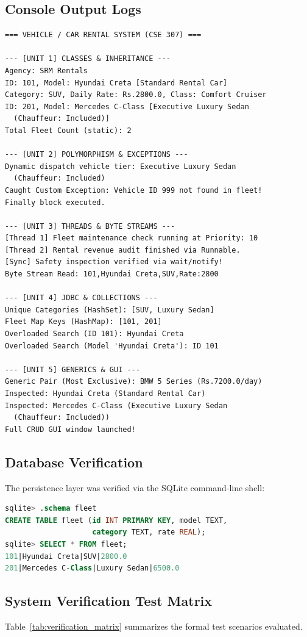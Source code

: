 \documentclass[11pt,a4paper]{article}
\begin{document}
\subsection{Console Output Logs}
\begin{lstlisting}[language={}, caption={Application Console Output}]
=== VEHICLE / CAR RENTAL SYSTEM (CSE 307) ===

--- [UNIT 1] CLASSES & INHERITANCE ---
Agency: SRM Rentals
ID: 101, Model: Hyundai Creta [Standard Rental Car]
Category: SUV, Daily Rate: Rs.2800.0, Class: Comfort Cruiser
ID: 201, Model: Mercedes C-Class [Executive Luxury Sedan
  (Chauffeur: Included)]
Total Fleet Count (static): 2

--- [UNIT 2] POLYMORPHISM & EXCEPTIONS ---
Dynamic dispatch vehicle tier: Executive Luxury Sedan
  (Chauffeur: Included)
Caught Custom Exception: Vehicle ID 999 not found in fleet!
Finally block executed.

--- [UNIT 3] THREADS & BYTE STREAMS ---
[Thread 1] Fleet maintenance check running at Priority: 10
[Thread 2] Rental revenue audit finished via Runnable.
[Sync] Safety inspection verified via wait/notify!
Byte Stream Read: 101,Hyundai Creta,SUV,Rate:2800

--- [UNIT 4] JDBC & COLLECTIONS ---
Unique Categories (HashSet): [SUV, Luxury Sedan]
Fleet Map Keys (HashMap): [101, 201]
Overloaded Search (ID 101): Hyundai Creta
Overloaded Search (Model 'Hyundai Creta'): ID 101

--- [UNIT 5] GENERICS & GUI ---
Generic Pair (Most Exclusive): BMW 5 Series (Rs.7200.0/day)
Inspected: Hyundai Creta (Standard Rental Car)
Inspected: Mercedes C-Class (Executive Luxury Sedan
  (Chauffeur: Included))
Full CRUD GUI window launched!
\end{lstlisting}

\subsection{Database Verification}
The persistence layer was verified via the SQLite command-line shell:
\begin{lstlisting}[language=sql, caption={SQLite Verification Queries}]
sqlite> .schema fleet
CREATE TABLE fleet (id INT PRIMARY KEY, model TEXT,
                    category TEXT, rate REAL);
sqlite> SELECT * FROM fleet;
101|Hyundai Creta|SUV|2800.0
201|Mercedes C-Class|Luxury Sedan|6500.0
\end{lstlisting}

\subsection{System Verification Test Matrix}
Table~\ref{tab:verification_matrix} summarizes the formal test scenarios evaluated.
\end{document}
